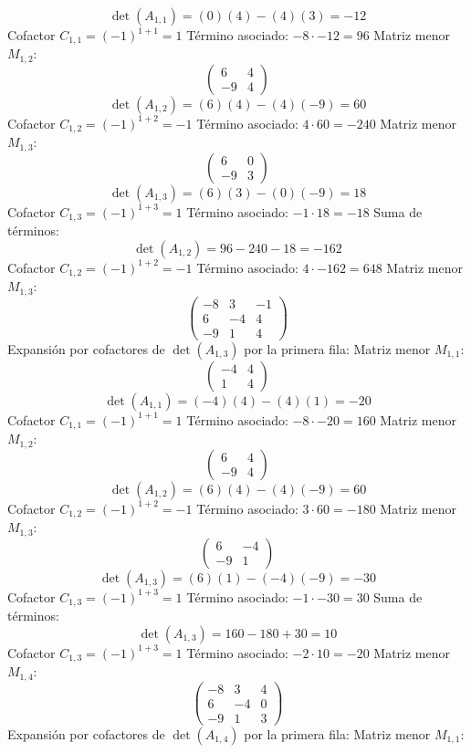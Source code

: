 \documentclass{article}
\begin{document}
\[\det(A_{1,1}) = (0)(4) - (4)(3) = -12\]
Cofactor $C_{1,1} = (-1)^{1+1} = 1$
Término asociado: $ -8 \cdot -12 = 96 $
Matriz menor $M_{1,2}$:
\[\begin{pmatrix}6 & 4 \\ -9 & 4\end{pmatrix}\]
\[\det(A_{1,2}) = (6)(4) - (4)(-9) = 60\]
Cofactor $C_{1,2} = (-1)^{1+2} = -1$
Término asociado: $ 4 \cdot 60 = -240 $
Matriz menor $M_{1,3}$:
\[\begin{pmatrix}6 & 0 \\ -9 & 3\end{pmatrix}\]
\[\det(A_{1,3}) = (6)(3) - (0)(-9) = 18\]
Cofactor $C_{1,3} = (-1)^{1+3} = 1$
Término asociado: $ -1 \cdot 18 = -18 $
Suma de términos:
\[\det(A_{1,2}) = 96 - 240 - 18 = -162\]
Cofactor $C_{1,2} = (-1)^{1+2} = -1$
Término asociado: $ 4 \cdot -162 = 648 $
Matriz menor $M_{1,3}$:
\[\begin{pmatrix}-8 & 3 & -1 \\ 6 & -4 & 4 \\ -9 & 1 & 4\end{pmatrix}\]
Expansión por cofactores de $\det(A_{1,3})$ por la primera fila:
Matriz menor $M_{1,1}$:
\[\begin{pmatrix}-4 & 4 \\ 1 & 4\end{pmatrix}\]
\[\det(A_{1,1}) = (-4)(4) - (4)(1) = -20\]
Cofactor $C_{1,1} = (-1)^{1+1} = 1$
Término asociado: $ -8 \cdot -20 = 160 $
Matriz menor $M_{1,2}$:
\[\begin{pmatrix}6 & 4 \\ -9 & 4\end{pmatrix}\]
\[\det(A_{1,2}) = (6)(4) - (4)(-9) = 60\]
Cofactor $C_{1,2} = (-1)^{1+2} = -1$
Término asociado: $ 3 \cdot 60 = -180 $
Matriz menor $M_{1,3}$:
\[\begin{pmatrix}6 & -4 \\ -9 & 1\end{pmatrix}\]
\[\det(A_{1,3}) = (6)(1) - (-4)(-9) = -30\]
Cofactor $C_{1,3} = (-1)^{1+3} = 1$
Término asociado: $ -1 \cdot -30 = 30 $
Suma de términos:
\[\det(A_{1,3}) = 160 - 180 + 30 = 10\]
Cofactor $C_{1,3} = (-1)^{1+3} = 1$
Término asociado: $ -2 \cdot 10 = -20 $
Matriz menor $M_{1,4}$:
\[\begin{pmatrix}-8 & 3 & 4 \\ 6 & -4 & 0 \\ -9 & 1 & 3\end{pmatrix}\]
Expansión por cofactores de $\det(A_{1,4})$ por la primera fila:
Matriz menor $M_{1,1}$:
\end{document}
